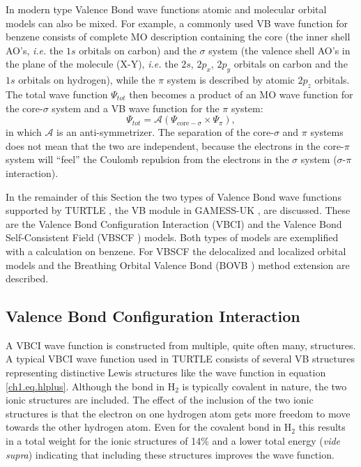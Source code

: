 In modern type Valence Bond wave functions atomic and molecular orbital models can also be mixed. For example, a commonly used VB wave function for benzene consists of complete MO description containing the core (the inner shell AO's, \textit{i.e.} the $1s$ orbitals on carbon) and the $\sigma$ system (the valence shell AO's in the plane of the molecule (X-Y), \textit{i.e.} the $2s$, $2p_x$, $2p_y$ orbitals on carbon and the $1s$ orbitals on hydrogen), while the $\pi$ system is described by atomic $2p_z$ orbitals. The total wave function $\Psi_{tot}$ then becomes a product of an MO wave function for the core-$\sigma$ system and a VB wave function for the $\pi$ system:
\begin{equation}
\Psi_{tot} = \mathcal{A}(\Psi_{\mathrm{core}-\sigma} \times \Psi_{\pi}),
\label{ch1.eq.prodbenzene}
\end{equation}
in which $\mathcal{A}$ is an anti-symmetrizer. The separation of the core-$\sigma$ and $\pi$ systems does not mean that the two are independent, because the electrons in the core-$\pi$ system will ``feel'' the Coulomb repulsion from the electrons in the $\sigma$ system ($\sigma$-$\pi$ interaction).

In the remainder of this Section the two types of Valence Bond wave functions supported by TURTLE \cite{turtle}, the VB module in GAMESS-UK \cite{gamess}, are discussed. These are the Valence Bond Configuration Interaction (VBCI) and the Valence Bond Self-Consistent Field (VBSCF \cite{vbscf1,vbscf2}) models. Both types of models are exemplified with a calculation on benzene. For VBSCF the delocalized and localized orbital models and the Breathing Orbital Valence Bond (BOVB \cite{bovb1,bovb2,bovb3}) method extension are described. 

\subsection{Valence Bond Configuration Interaction}

A VBCI wave function is constructed from multiple, quite often many, structures. A typical VBCI wave function used in TURTLE consists of several VB structures representing distinctive Lewis structures like the wave function in equation \ref{ch1.eq.hlplus}. Although the bond in H$_2$ is typically covalent in nature, the two ionic structures are included. The effect of the inclusion of the two ionic structures is that the electron on one hydrogen atom gets more freedom to move towards the other hydrogen atom. Even for the covalent bond in H$_2$ this results in a total weight for the ionic structures of 14\% and a lower total energy (\textit{vide supra}) indicating that including these structures improves the wave function.


